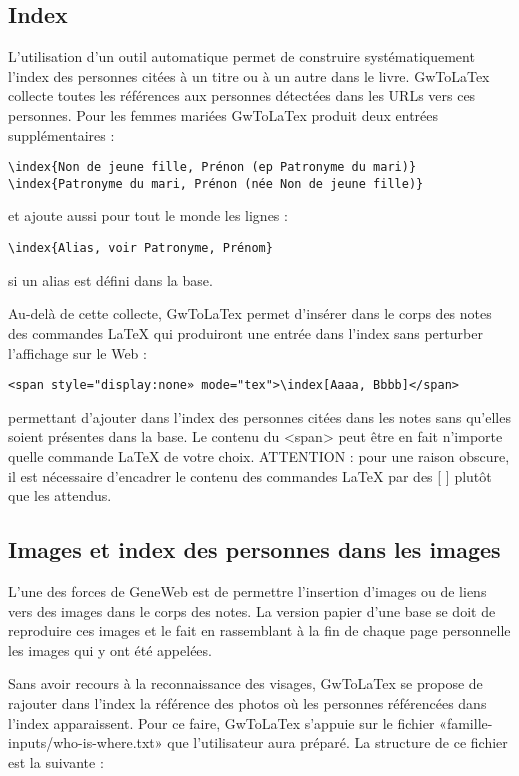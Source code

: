 \subsection{Index}

L'utilisation d'un outil automatique permet de construire systématiquement
l'index des personnes citées à un titre ou à un autre dans le livre.
GwToLaTex collecte toutes les références aux personnes
détectées dans les URLs vers ces personnes. Pour les femmes mariées
GwToLaTex produit deux entrées supplémentaires :
\begin{verbatim}
\index{Non de jeune fille, Prénon (ep Patronyme du mari)}
\index{Patronyme du mari, Prénon (née Non de jeune fille)}
\end{verbatim}
et ajoute aussi pour tout le monde les lignes :
\begin{verbatim}
\index{Alias, voir Patronyme, Prénom}
\end{verbatim}
si un alias est défini dans la base.

Au-delà de cette collecte, GwToLaTex permet d'insérer dans le corps des notes
des commandes LaTeX qui produiront une entrée dans l'index sans perturber
l'affichage sur le Web :
\begin{verbatim}
<span style="display:none» mode="tex">\index[Aaaa, Bbbb]</span>
\end{verbatim}
permettant d'ajouter dans l'index des personnes citées dans les notes
sans qu'elles soient présentes dans la base.
Le contenu du <span> peut être en fait n'importe quelle commande LaTeX de votre choix.
ATTENTION : pour une raison obscure, il est nécessaire d'encadrer le
contenu des commandes LaTeX par des [ ] plutôt que les { } attendus.

\subsection{Images et index des personnes dans les images}

L'une des forces de GeneWeb est de permettre l'insertion d'images ou de 
liens vers des images dans le corps des notes. La version papier d'une base
se doit de reproduire ces images et le fait en rassemblant à la fin de chaque
page personnelle les images qui y ont été appelées.

Sans avoir recours à la reconnaissance des visages, GwToLaTex se propose de
rajouter dans l'index la référence des photos où les personnes référencées
dans l'index apparaissent. Pour ce faire, GwToLaTex s'appuie sur le fichier
«famille-inputs/who-is-where.txt» que l'utilisateur aura préparé.
La structure de ce fichier est la suivante :


